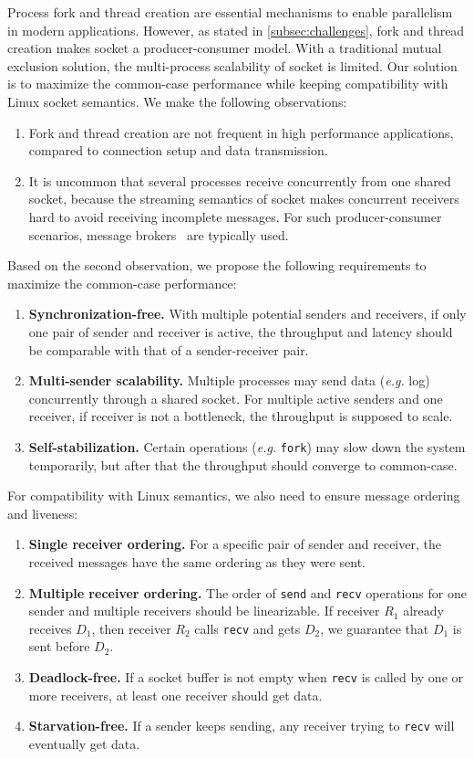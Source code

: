 Process fork and thread creation are essential mechanisms to enable parallelism in modern applications. 
However, as stated in \ref{subsec:challenges}, fork and thread creation makes socket a producer-consumer model. With a traditional mutual exclusion solution, the multi-process scalability of socket is limited. Our solution is to maximize the common-case performance while keeping compatibility with Linux socket semantics.
We make the following observations:
\begin{enumerate}
	\item Fork and thread creation are not frequent in high performance applications, compared to connection setup and data transmission.
	\item It is uncommon that several processes receive concurrently from one shared socket, because the streaming semantics of socket makes concurrent receivers hard to avoid receiving incomplete messages. For such producer-consumer scenarios, message brokers~\cite{hintjens2013zeromq,rabbitmq2017rabbitmq,kreps2011kafka} are typically used.
\end{enumerate}

Based on the second observation, we propose the following requirements to maximize the common-case performance:
\begin{enumerate}
 \item \textbf{Synchronization-free.} With multiple potential senders and receivers, if only one pair of sender and receiver is active, the throughput and latency should be comparable with that of a sender-receiver pair.
 \item \textbf{Multi-sender scalability.} Multiple processes may send data (\textit{e.g.} log) concurrently through a shared socket. For multiple active senders and one receiver, if receiver is not a bottleneck, the throughput is supposed to scale.
 \item \textbf{Self-stabilization.} Certain operations (\textit{e.g.} \texttt{fork}) may slow down the system temporarily, but after that the throughput should converge to common-case.
\end{enumerate}

For compatibility with Linux semantics, we also need to ensure message ordering and liveness:
\begin{enumerate}
\item \textbf{Single receiver ordering.} For a specific pair of sender and receiver, the received messages have the same ordering as they were sent.
\item \textbf{Multiple receiver ordering.} The order of \texttt{send} and \texttt{recv} operations for one sender and multiple receivers should be linearizable. If receiver $R_1$ already receives $D_1$, then receiver $R_2$ calls \texttt{recv} and gets $D_2$, we guarantee that $D_1$ is sent before $D_2$.
\item \textbf{Deadlock-free.} If a socket buffer is not empty when \texttt{recv} is called by one or more receivers, at least one receiver should get data.
\item \textbf{Starvation-free.} If a sender keeps sending, any receiver trying to \texttt{recv} will eventually get data.
\end{enumerate}


